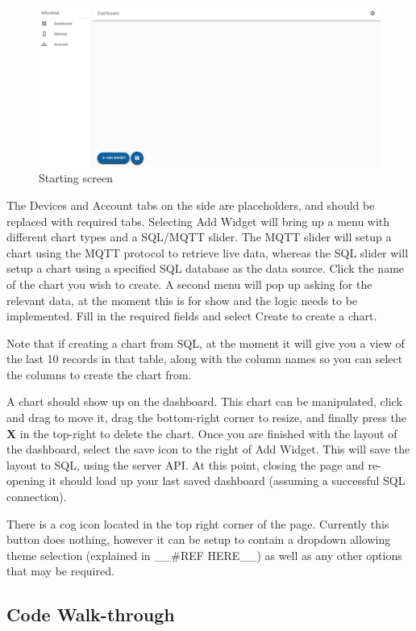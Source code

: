 \documentclass[12pt, titlepage]{article}
\begin{document}
\begin{figure}[H]
\centering
\includegraphics[width=0.9\linewidth]{./assets/Dash.PNG}
\caption{Starting screen}
\label{fig:dash}
\end{figure}



The Devices and Account tabs on the side are placeholders, and should be replaced with required tabs. Selecting Add Widget will bring up a menu with different chart types and a SQL/MQTT slider. The MQTT slider will setup a chart using the MQTT protocol to retrieve live data, whereas the SQL slider will setup a chart using a specified SQL database as the data source. Click the name of the chart you wish to create. A second menu will pop up asking for the relevant data, at the moment this is for show and the logic needs to be implemented. Fill in the required fields and select Create to create a chart.

Note that if creating a chart from SQL, at the moment it will give you a view of the last 10 records in that table, along with the column names so you can select the columns to create the chart from.

A chart should show up on the dashboard. This chart can be manipulated, click and drag to move it, drag the bottom-right corner to resize, and finally press the \textbf{X} in the top-right to delete the chart. Once you are finished with the layout of the dashboard, select the save icon to the right of Add Widget. This will save the layout to SQL, using the server API. At this point, closing the page and re-opening it should load up your last saved dashboard (assuming a successful SQL connection).

There is a cog icon located in the top right corner of the page. Currently this button does nothing, however it can be setup to contain a dropdown allowing theme selection (explained in \_\_\#REF HERE\_\_) as well as any other options that may be required.
\subsection{Code Walk-through}
\end{document}

